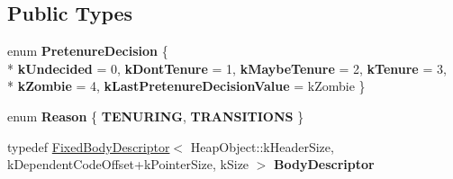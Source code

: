 \subsection*{Public Types}
\begin{DoxyCompactItemize}
\item 
\hypertarget{classv8_1_1internal_1_1_allocation_site_a90e0736002b73f20d96abede63a5395b}{}enum {\bfseries Pretenure\+Decision} \{ \\*
{\bfseries k\+Undecided} = 0, 
{\bfseries k\+Dont\+Tenure} = 1, 
{\bfseries k\+Maybe\+Tenure} = 2, 
{\bfseries k\+Tenure} = 3, 
\\*
{\bfseries k\+Zombie} = 4, 
{\bfseries k\+Last\+Pretenure\+Decision\+Value} = k\+Zombie
 \}\label{classv8_1_1internal_1_1_allocation_site_a90e0736002b73f20d96abede63a5395b}

\item 
\hypertarget{classv8_1_1internal_1_1_allocation_site_ab9c1b2d67cd67409bfe0cba3735e2aed}{}enum {\bfseries Reason} \{ {\bfseries T\+E\+N\+U\+R\+I\+N\+G}, 
{\bfseries T\+R\+A\+N\+S\+I\+T\+I\+O\+N\+S}
 \}\label{classv8_1_1internal_1_1_allocation_site_ab9c1b2d67cd67409bfe0cba3735e2aed}

\item 
\hypertarget{classv8_1_1internal_1_1_allocation_site_a368925e7d7e139cfdf582b93418f9527}{}typedef \hyperlink{classv8_1_1internal_1_1_fixed_body_descriptor}{Fixed\+Body\+Descriptor}$<$ Heap\+Object\+::k\+Header\+Size, k\+Dependent\+Code\+Offset+k\+Pointer\+Size, k\+Size $>$ {\bfseries Body\+Descriptor}\label{classv8_1_1internal_1_1_allocation_site_a368925e7d7e139cfdf582b93418f9527}

\end{DoxyCompactItemize}
